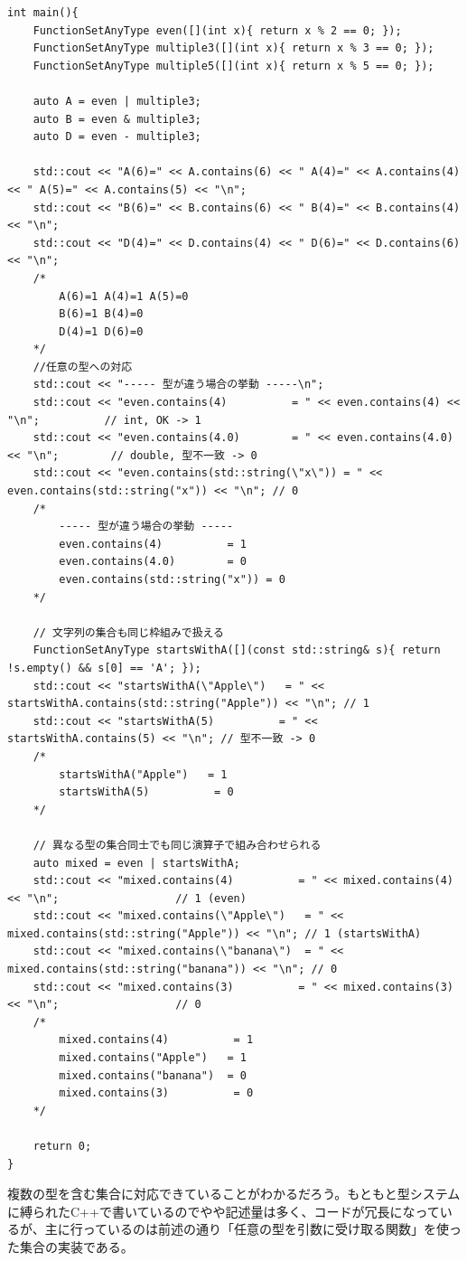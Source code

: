 \documentclass[a4paper,11pt]{ltjsarticle}
\begin{document}
\begin{lstlisting}
int main(){
    FunctionSetAnyType even([](int x){ return x % 2 == 0; });
    FunctionSetAnyType multiple3([](int x){ return x % 3 == 0; });
    FunctionSetAnyType multiple5([](int x){ return x % 5 == 0; });

    auto A = even | multiple3;
    auto B = even & multiple3;
    auto D = even - multiple3;

    std::cout << "A(6)=" << A.contains(6) << " A(4)=" << A.contains(4) << " A(5)=" << A.contains(5) << "\n";
    std::cout << "B(6)=" << B.contains(6) << " B(4)=" << B.contains(4) << "\n";
    std::cout << "D(4)=" << D.contains(4) << " D(6)=" << D.contains(6) << "\n";
    /*
        A(6)=1 A(4)=1 A(5)=0
        B(6)=1 B(4)=0
        D(4)=1 D(6)=0
    */
    //任意の型への対応
    std::cout << "----- 型が違う場合の挙動 -----\n";
    std::cout << "even.contains(4)          = " << even.contains(4) << "\n";          // int, OK -> 1
    std::cout << "even.contains(4.0)        = " << even.contains(4.0) << "\n";        // double, 型不一致 -> 0
    std::cout << "even.contains(std::string(\"x\")) = " << even.contains(std::string("x")) << "\n"; // 0
    /*
        ----- 型が違う場合の挙動 -----
        even.contains(4)          = 1
        even.contains(4.0)        = 0
        even.contains(std::string("x")) = 0
    */

    // 文字列の集合も同じ枠組みで扱える
    FunctionSetAnyType startsWithA([](const std::string& s){ return !s.empty() && s[0] == 'A'; });
    std::cout << "startsWithA(\"Apple\")   = " << startsWithA.contains(std::string("Apple")) << "\n"; // 1
    std::cout << "startsWithA(5)          = " << startsWithA.contains(5) << "\n"; // 型不一致 -> 0
    /*
        startsWithA("Apple")   = 1
        startsWithA(5)          = 0
    */

    // 異なる型の集合同士でも同じ演算子で組み合わせられる
    auto mixed = even | startsWithA;
    std::cout << "mixed.contains(4)          = " << mixed.contains(4) << "\n";                  // 1 (even)
    std::cout << "mixed.contains(\"Apple\")   = " << mixed.contains(std::string("Apple")) << "\n"; // 1 (startsWithA)
    std::cout << "mixed.contains(\"banana\")  = " << mixed.contains(std::string("banana")) << "\n"; // 0
    std::cout << "mixed.contains(3)          = " << mixed.contains(3) << "\n";                  // 0
    /*
        mixed.contains(4)          = 1
        mixed.contains("Apple")   = 1
        mixed.contains("banana")  = 0
        mixed.contains(3)          = 0
    */

    return 0;
}
\end{lstlisting}
複数の型を含む集合に対応できていることがわかるだろう。もともと型システムに縛られたC++で書いているのでやや記述量は多く、コードが冗長になっているが、主に行っているのは前述の通り「任意の型を引数に受け取る関数」を使った集合の実装である。
\end{document}
